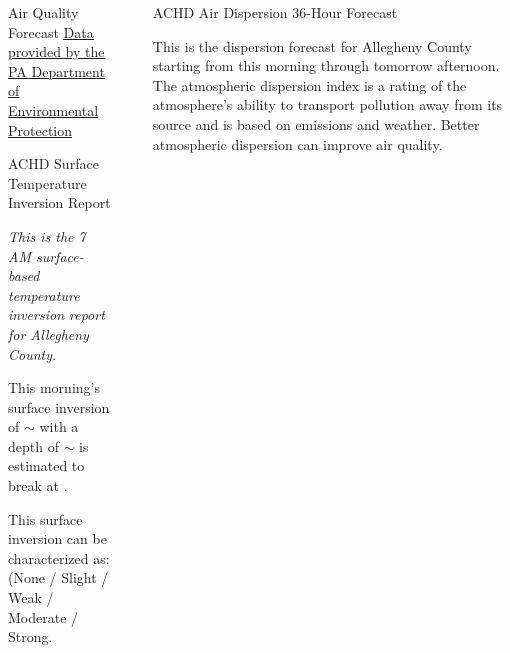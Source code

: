 \documentclass[final, xcolor=table]{beamer}
\newlength{\sepwidth}
\newlength{\colwidth}
\newcommand{\separatorcolumn}{\begin{column}{\sepwidth}\end{column}}
\begin{document}
\begin{frame}[t]
\begin{columns}[t]
\begin{column}{\colwidth}
\begin{block}{Air Quality Forecast}
    \href{https://www.ahs.dep.pa.gov/AQPartnersWeb/forecast_home.aspx}{\underline{Data provided by the PA Department of Environmental Protection}}

  \end{block} 
  

  \begin{block}{ACHD Surface Temperature Inversion Report}

    \textit{This is the 7 AM surface-based temperature inversion report for Allegheny County.}

    This morning’s surface inversion of \underline{\textbf{$\sim$\Temp}} with a depth of \underline{\textbf{$\sim$\Depth}} is estimated to break at \underline{\textbf{\Time}}. 
    
    This surface inversion can be characterized as: \underline{\textbf{\Scale}} (None / Slight / Weak / Moderate / Strong. 
    
    \Inversion

  \end{block}

\end{column} 

\separatorcolumn



\begin{column}{\colwidth}


  \begin{block}{ACHD Air Dispersion 36-Hour Forecast}

    This is the dispersion forecast for Allegheny County starting from this morning through tomorrow afternoon. The atmospheric dispersion index is a rating of the atmosphere’s ability to transport pollution away from its source and is based on emissions and weather. Better atmospheric dispersion can improve air quality.


\end{block}
\end{column}
\end{columns}
\end{frame}
\end{document}
